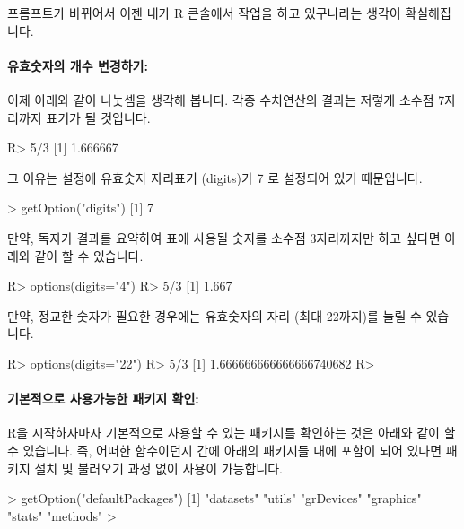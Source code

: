 \documentclass[tutorial.tex]{subfiles}
\begin{document}
프롬프트가 바뀌어서 이젠 내가 R 콘솔에서 작업을 하고 있구나라는 생각이 확실해집니다.

\paragraph{유효숫자의 개수 변경하기: } 이제 아래와 같이 나눗셈을 생각해 봅니다. 
각종 수치연산의 결과는 저렇게 소수점 7자리까지 표기가 될 것입니다. 

\begin{Schunk}
\begin{Soutput}
R> 5/3
[1] 1.666667
\end{Soutput}
\end{Schunk}

그 이유는 설정에 유효숫자 자리표기 (digits)가 7 로 설정되어 있기 때문입니다. 

\begin{Schunk}
\begin{Soutput}
> getOption("digits")
[1] 7
\end{Soutput}
\end{Schunk}

만약, 독자가 결과를 요약하여 표에 사용될 숫자를 소수점 3자리까지만 하고 싶다면 아래와 같이 할 수 있습니다. 

\begin{Schunk}
\begin{Soutput}
R> options(digits="4")
R> 5/3
[1] 1.667
\end{Soutput}
\end{Schunk}

만약, 정교한 숫자가 필요한 경우에는 유효숫자의 자리 (최대 22까지)를 늘릴 수 있습니다. 

\begin{Schunk}
\begin{Soutput}
R> options(digits="22")
R> 5/3
[1] 1.666666666666666740682
R> 
\end{Soutput}
\end{Schunk}

\paragraph{기본적으로 사용가능한 패키지 확인:} 
R을 시작하자마자 기본적으로 사용할 수 있는 패키지를 확인하는 것은 아래와 같이 할 수 있습니다. 
즉, 어떠한 함수이던지 간에 아래의 패키지들 내에 포함이 되어 있다면 패키지 설치 및 불러오기 과정 없이 사용이 가능합니다. 
 
\begin{Schunk}
\begin{Soutput}
> getOption("defaultPackages")
[1] "datasets"  "utils"     "grDevices" "graphics"  "stats"     "methods"  
> 
\end{Soutput}
\end{Schunk}
\end{document}
